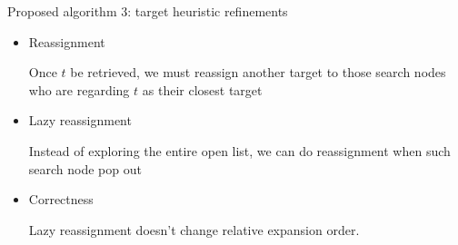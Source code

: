 \begin{frame}{Proposed algorithm 3: target heuristic refinements}
\begin{minipage}{.9\textwidth}
\begin{itemize}
    \item \small{Reassignment}
    \begin{definition}
        \small Once $t$ be retrieved, we must reassign another target to those search nodes who are regarding $t$ as their closest target
    \end{definition}
    \item \small{Lazy reassignment}
    \begin{definition}
        \small Instead of exploring the entire open list, we can do reassignment when such search node pop out
    \end{definition}
    \item \small{Correctness}
    \begin{lemma}
        \small Lazy reassignment doesn't change relative expansion order.
    \end{lemma}
\end{itemize}
\end{minipage}%
\end{frame}
